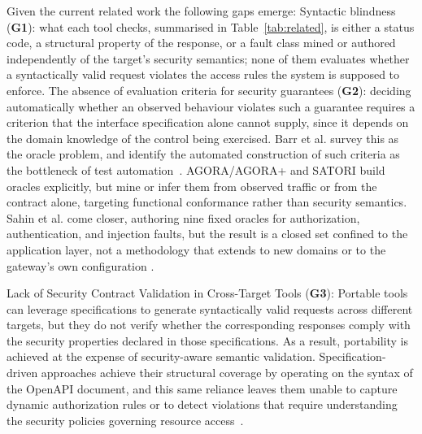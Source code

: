 Given the current related work the following gaps emerge:
Syntactic blindness (\textbf{G1}): what each tool checks, summarised in Table~\ref{tab:related}, is either a status code, a structural property of the response, or a fault class mined or authored independently of the target's security semantics; none of them evaluates whether a syntactically valid request violates the access rules the system is supposed to enforce.
The absence of evaluation criteria for security guarantees (\textbf{G2}): deciding automatically whether an observed behaviour violates such a guarantee requires a criterion that the interface specification alone cannot supply, since it depends on the domain knowledge of the control being exercised.
Barr et al. survey this as the oracle problem, and identify the automated construction of such criteria as the bottleneck of test automation~\cite{barrOracleProblemSoftware2015}. AGORA/AGORA+ and SATORI build oracles explicitly, but mine or infer them from observed traffic or from the contract alone, targeting functional conformance rather than security semantics. Sahin et al. come closer, authoring nine fixed oracles for authorization, authentication, and injection faults, but the result is a closed set confined to the application layer, not a methodology that extends to new domains or to the gateway's own configuration \cite{sahinEnhancingRESTAPI2026}.

Lack of Security Contract Validation in Cross-Target Tools (\textbf{G3}): Portable tools can leverage specifications to generate syntactically valid requests across different targets, but they do not verify whether the corresponding responses comply with the security properties declared in those specifications. As a result, portability is achieved at the expense of security-aware semantic validation.
Specification-driven approaches achieve their structural coverage by operating on the syntax of the OpenAPI document, and this same reliance leaves them unable to capture dynamic authorization rules or to detect violations that require understanding the security policies governing resource access~\cite{abinayaSecurityTestingRESTful2027}.

